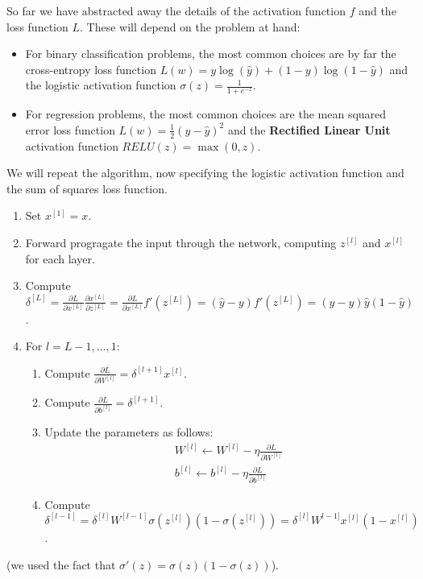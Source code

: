 \documentclass{article}
\begin{document}
So far we have abstracted away the details of the activation function $f$ and the loss function $L$.
These will depend on the problem at hand:
\begin{itemize}
\item For binary classification problems, the most common choices are by far the cross-entropy loss function $L(w) = y \log(\hat{y}) + (1-y) \log(1-\hat{y})$ and the logistic activation function $\sigma(z) = \frac{1}{1+e^{-z}}$.
\item For regression problems, the most common choices are the mean squared error loss function $L(w) = \frac{1}{2} (y-\hat{y})^2$ and the \textbf{Rectified Linear Unit} activation function $RELU(z) = \max(0,z)$.
\end{itemize}

We will repeat the algorithm, now specifying the logistic activation function and the sum of squares loss function.
\begin{enumerate}
\item Set $x^{[1]} = x$.
\item Forward progragate the input through the network, computing $z^{[l]}$ and $x^{[l]}$ for each layer.
\item Compute $\delta^{[L]} = \frac{\partial L}{\partial x^{[L]}} \frac{\partial x^{[L]}}{\partial z^{[L]}} = \frac{\partial L}{\partial x^{[L]}} f'(z^{[L]}) = (\hat{y}-y) f'(z^{[L]}) = (\hat{y}-y) \hat{y}(1-\hat{y})$.
\item For $l = L-1, \dots, 1$:
\begin{enumerate}
\item Compute $\frac{\partial L}{\partial W^{[l]}} = \delta^{[l+1]} x^{[l]}$.
\item Compute $\frac{\partial L}{\partial b^{[l]}} = \delta^{[l+1]}$.
\item Update the parameters as follows:
\begin{gather*}
W^{[l]} \leftarrow W^{[l]} - \eta \frac{\partial L}{\partial W^{[l]}} \\
b^{[l]} \leftarrow b^{[l]} - \eta \frac{\partial L}{\partial b^{[l]}}
\end{gather*}
\item Compute $\delta^{[l-1]} = \delta^{[l]} W^{[l-1]} \sigma(z^{[l]})(1-\sigma(z^{[l]})) = \delta^{[l]}W^{l-1]}x^{[l]}(1-x^{[l]})$.
\end{enumerate}
\end{enumerate}

(we used the fact that $\sigma'(z) = \sigma(z)(1-\sigma(z))$).
\end{document}
